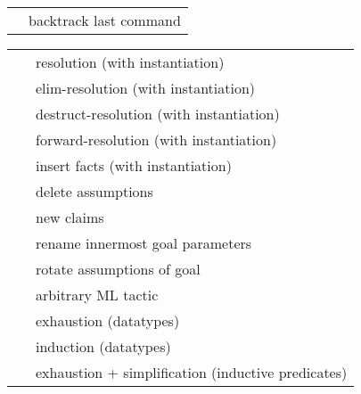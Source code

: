 \begin{isabellebody}
\begin{isamarkuptext}
\begin{tabular}{ll}
    \mbox{\isa{\isacommand{back}}} & backtrack last command \\
  \end{tabular}%
\end{isamarkuptext}%
\isamarkuptrue%
%
\isamarkuptrue%
%
\begin{isamarkuptext}%
\begin{tabular}{ll}
    \mbox{\isa{rule{\isacharunderscore}tac}}~\isa{insts} & resolution (with instantiation) \\
    \mbox{\isa{erule{\isacharunderscore}tac}}~\isa{insts} & elim-resolution (with instantiation) \\
    \mbox{\isa{drule{\isacharunderscore}tac}}~\isa{insts} & destruct-resolution (with instantiation) \\
    \mbox{\isa{frule{\isacharunderscore}tac}}~\isa{insts} & forward-resolution (with instantiation) \\
    \mbox{\isa{cut{\isacharunderscore}tac}}~\isa{insts} & insert facts (with instantiation) \\
    \mbox{\isa{thin{\isacharunderscore}tac}}~\isa{{\isasymphi}} & delete assumptions \\
    \mbox{\isa{subgoal{\isacharunderscore}tac}}~\isa{{\isasymphi}} & new claims \\
    \mbox{\isa{rename{\isacharunderscore}tac}}~\isa{x} & rename innermost goal parameters \\
    \mbox{\isa{rotate{\isacharunderscore}tac}}~\isa{n} & rotate assumptions of goal \\
    \mbox{\isa{tactic}}~\isa{{\isachardoublequote}text{\isachardoublequote}} & arbitrary ML tactic \\
    \mbox{\isa{case{\isacharunderscore}tac}}~\isa{t} & exhaustion (datatypes) \\
    \mbox{\isa{induct{\isacharunderscore}tac}}~\isa{x} & induction (datatypes) \\
    \mbox{\isa{ind{\isacharunderscore}cases}}~\isa{t} & exhaustion + simplification (inductive predicates) \\
  \end{tabular}%
\end{isamarkuptext}%
\isamarkuptrue%
%
\isadelimtheory
%
\endisadelimtheory
%
\isatagtheory
{}\isamarkupfalse%
%
\endisatagtheory
{\isafoldtheory}%
%
\isadelimtheory
%
\endisadelimtheory
\isanewline
\end{isabellebody}%
